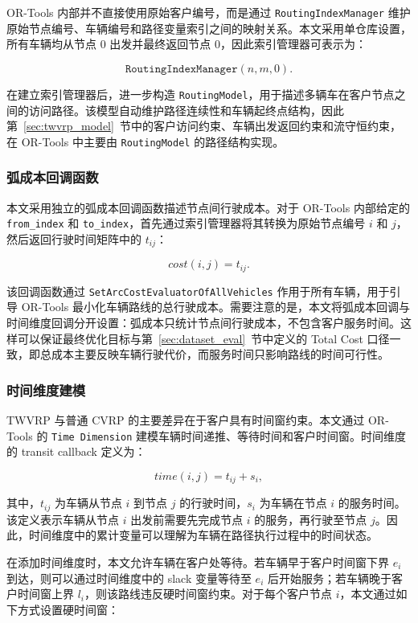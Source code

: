 \documentclass[12pt,a4paper,UTF8]{article}
\begin{document}
OR-Tools 内部并不直接使用原始客户编号，而是通过 \texttt{RoutingIndexManager} 维护原始节点编号、车辆编号和路径变量索引之间的映射关系。本文采用单仓库设置，所有车辆均从节点 $0$ 出发并最终返回节点 $0$，因此索引管理器可表示为：

\[
    \texttt{RoutingIndexManager}(n, m, 0).
\]

在建立索引管理器后，进一步构造 \texttt{RoutingModel}，用于描述多辆车在客户节点之间的访问路径。该模型自动维护路径连续性和车辆起终点结构，因此第~\ref{sec:twvrp_model}~节中的客户访问约束、车辆出发返回约束和流守恒约束，在 OR-Tools 中主要由 \texttt{RoutingModel} 的路径结构实现。

\subsubsection{弧成本回调函数}

本文采用独立的弧成本回调函数描述节点间行驶成本。对于 OR-Tools 内部给定的 \texttt{from\_index} 和 \texttt{to\_index}，首先通过索引管理器将其转换为原始节点编号 $i$ 和 $j$，然后返回行驶时间矩阵中的 $t_{ij}$：

\[
    cost(i,j)=t_{ij}.
\]

该回调函数通过 \texttt{SetArcCostEvaluatorOfAllVehicles} 作用于所有车辆，用于引导 OR-Tools 最小化车辆路线的总行驶成本。需要注意的是，本文将弧成本回调与时间维度回调分开设置：弧成本只统计节点间行驶成本，不包含客户服务时间。这样可以保证最终优化目标与第~\ref{sec:dataset_eval}~节中定义的 Total Cost 口径一致，即总成本主要反映车辆行驶代价，而服务时间只影响路线的时间可行性。

\subsubsection{时间维度建模}

TWVRP 与普通 CVRP 的主要差异在于客户具有时间窗约束。本文通过 OR-Tools 的 \texttt{Time Dimension} 建模车辆时间递推、等待时间和客户时间窗。时间维度的 transit callback 定义为：

\[
    time(i,j)=t_{ij}+s_i,
\]

其中，$t_{ij}$ 为车辆从节点 $i$ 到节点 $j$ 的行驶时间，$s_i$ 为车辆在节点 $i$ 的服务时间。该定义表示车辆从节点 $i$ 出发前需要先完成节点 $i$ 的服务，再行驶至节点 $j$。因此，时间维度中的累计变量可以理解为车辆在路径执行过程中的时间状态。

在添加时间维度时，本文允许车辆在客户处等待。若车辆早于客户时间窗下界 $e_i$ 到达，则可以通过时间维度中的 slack 变量等待至 $e_i$ 后开始服务；若车辆晚于客户时间窗上界 $l_i$，则该路线违反硬时间窗约束。对于每个客户节点 $i$，本文通过如下方式设置硬时间窗：
\end{document}
